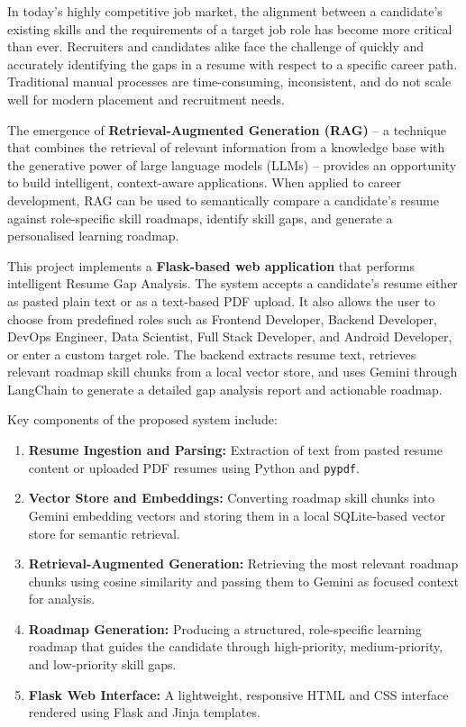 \documentclass[12pt,a4paper]{report}
\begin{document}
In today's highly competitive job market, the alignment between a candidate's
existing skills and the requirements of a target job role has become more critical
than ever. Recruiters and candidates alike face the challenge of quickly and
accurately identifying the gaps in a resume with respect to a specific career
path. Traditional manual processes are time-consuming, inconsistent, and do not
scale well for modern placement and recruitment needs.

The emergence of \textbf{Retrieval-Augmented Generation (RAG)} -- a technique
that combines the retrieval of relevant information from a knowledge base with
the generative power of large language models (LLMs) -- provides an opportunity
to build intelligent, context-aware applications. When applied to career
development, RAG can be used to semantically compare a candidate's resume
against role-specific skill roadmaps, identify skill gaps, and generate a
personalised learning roadmap.

This project implements a \textbf{Flask-based web application} that performs
intelligent Resume Gap Analysis. The system accepts a candidate's resume either
as pasted plain text or as a text-based PDF upload. It also allows the user to
choose from predefined roles such as Frontend Developer, Backend Developer,
DevOps Engineer, Data Scientist, Full Stack Developer, and Android Developer,
or enter a custom target role. The backend extracts resume text, retrieves
relevant roadmap skill chunks from a local vector store, and uses Gemini through
LangChain to generate a detailed gap analysis report and actionable roadmap.

Key components of the proposed system include:

\begin{enumerate}
  \item \textbf{Resume Ingestion and Parsing:} Extraction of text from pasted
        resume content or uploaded PDF resumes using Python and \texttt{pypdf}.
  \item \textbf{Vector Store and Embeddings:} Converting roadmap skill chunks
        into Gemini embedding vectors and storing them in a local SQLite-based
        vector store for semantic retrieval.
  \item \textbf{Retrieval-Augmented Generation:} Retrieving the most relevant
        roadmap chunks using cosine similarity and passing them to Gemini as
        focused context for analysis.
  \item \textbf{Roadmap Generation:} Producing a structured, role-specific
        learning roadmap that guides the candidate through high-priority,
        medium-priority, and low-priority skill gaps.
  \item \textbf{Flask Web Interface:} A lightweight, responsive HTML and CSS
        interface rendered using Flask and Jinja templates.
\end{enumerate}
\end{document}
